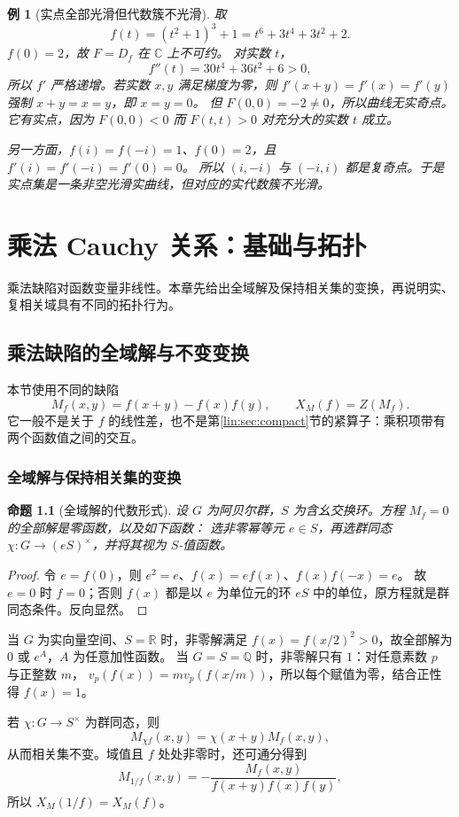 \documentclass[11pt,a4paper,oneside,openany]{book}
\theoremstyle{lecture}
\newtheorem{proposition}[theorem]{命题}
\newtheorem{example}[theorem]{例}
\newcommand{\Q}{\mathbb Q}
\newcommand{\R}{\mathbb R}
\newcommand{\C}{\mathbb C}
\numberwithin{equation}{section}
\begin{document}
\begin{example}[实点全部光滑但代数簇不光滑]\label{geo:ex:smoothcounter}
取
\[
 f(t)=(t^2+1)^3+1=t^6+3t^4+3t^2+2.
\]
$f(0)=2$，故 $F=D_f$ 在 $\C$ 上不可约。
对实数 $t$，
\[
 f''(t)=30t^4+36t^2+6>0,
\]
所以 $f'$ 严格递增。若实数 $x,y$ 满足梯度为零，则
$f'(x+y)=f'(x)=f'(y)$ 强制 $x+y=x=y$，即 $x=y=0$。
但 $F(0,0)=-2\ne0$，所以曲线无实奇点。
它有实点，因为 $F(0,0)<0$ 而 $F(t,t)>0$ 对充分大的实数 $t$ 成立。

另一方面，$f(i)=f(-i)=1$、$f(0)=2$，且 $f'(i)=f'(-i)=f'(0)=0$。
所以 $(i,-i)$ 与 $(-i,i)$ 都是复奇点。于是实点集是一条非空光滑实曲线，但对应的实代数簇不光滑。
\end{example}


\chapter{乘法 Cauchy 关系：基础与拓扑}\label{ch:mult}
乘法缺陷对函数变量非线性。本章先给出全域解及保持相关集的变换，再说明实、复相关域具有不同的拓扑行为。
\section{乘法缺陷的全域解与不变变换}\label{geo:sec:multiplicative}
本节使用不同的缺陷
\[
 M_f(x,y)=f(x+y)-f(x)f(y),\qquad X_M(f)=Z(M_f).
\]
它一般不是关于 $f$ 的线性差，也不是第\ref{lin:sec:compact}节的紧算子：乘积项带有两个函数值之间的交互。

\subsection{全域解与保持相关集的变换}
\begin{proposition}[全域解的代数形式]
设 $G$ 为阿贝尔群，$S$ 为含幺交换环。方程 $M_f=0$ 的全部解是零函数，以及如下函数：
选非零幂等元 $e\in S$，再选群同态
$\chi:G\to(eS)^\times$，并将其视为 $S$-值函数。
\end{proposition}
\begin{proof}
令 $e=f(0)$，则 $e^2=e$、$f(x)=ef(x)$、$f(x)f(-x)=e$。
故 $e=0$ 时 $f=0$；否则 $f(x)$ 都是以 $e$ 为单位元的环 $eS$ 中的单位，原方程就是群同态条件。反向显然。
\end{proof}
当 $G$ 为实向量空间、$S=\R$ 时，非零解满足 $f(x)=f(x/2)^2>0$，故全部解为 $0$ 或 $e^A$，$A$ 为任意加性函数。
当 $G=S=\Q$ 时，非零解只有 $1$：对任意素数 $p$ 与正整数 $m$，
$v_p(f(x))=m v_p(f(x/m))$，所以每个赋值为零，结合正性得 $f(x)=1$。

若 $\chi:G\to S^\times$ 为群同态，则
\[
 M_{\chi f}(x,y)=\chi(x+y)M_f(x,y),
\]
从而相关集不变。域值且 $f$ 处处非零时，还可通分得到
\[
 M_{1/f}(x,y)=-\frac{M_f(x,y)}{f(x+y)f(x)f(y)},
\]
所以 $X_M(1/f)=X_M(f)$。
\end{document}
